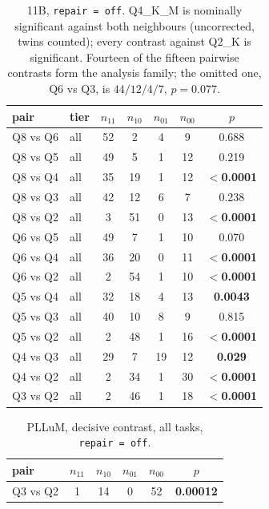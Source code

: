 \documentclass[11pt]{article}
\begin{document}
\begin{table}[h]
\centering\small
\caption{11B, \texttt{repair\,=\,off}. Q4\_K\_M is nominally significant against both neighbours (uncorrected, twins counted); every contrast against Q2\_K is significant. Fourteen of the fifteen pairwise contrasts form the analysis family; the omitted one, Q6 vs Q3, is $44/12/4/7$, $p=0.077$.}
\label{tab:mcnemar11b}
\begin{tabular}{llccccc}
\toprule
pair & tier & $n_{11}$ & $n_{10}$ & $n_{01}$ & $n_{00}$ & $p$ \\
\midrule
Q8 vs Q6 & all  & 52 & 2 & 4 & 9 & 0.688 \\
Q8 vs Q5 & all  & 49 & 5 & 1 & 12& 0.219 \\
Q8 vs Q4 & all  & 35 & 19& 1 & 12& \textbf{$<$0.0001} \\
Q8 vs Q3 & all  & 42 & 12& 6 & 7 & 0.238 \\
Q8 vs Q2 & all  & 3  & 51& 0 & 13& \textbf{$<$0.0001} \\
Q6 vs Q5 & all  & 49 & 7 & 1 & 10& 0.070 \\
Q6 vs Q4 & all  & 36 & 20& 0 & 11& \textbf{$<$0.0001} \\
Q6 vs Q2 & all  & 2  & 54& 1 & 10& \textbf{$<$0.0001} \\
Q5 vs Q4 & all  & 32 & 18& 4 & 13& \textbf{0.0043} \\
Q5 vs Q3 & all  & 40 & 10& 8 & 9 & 0.815 \\
Q5 vs Q2 & all  & 2  & 48& 1 & 16& \textbf{$<$0.0001} \\
Q4 vs Q3 & all  & 29 & 7 & 19& 12& \textbf{0.029} \\
Q4 vs Q2 & all  & 2  & 34& 1 & 30& \textbf{$<$0.0001} \\
Q3 vs Q2 & all  & 2  & 46& 1 & 18& \textbf{$<$0.0001} \\
\bottomrule
\end{tabular}
\end{table}

\begin{table}[h]
\centering\small
\caption{PLLuM, decisive contrast, all tasks, \texttt{repair\,=\,off}.}
\label{tab:mcnemarpllum}
\begin{tabular}{lccccc}
\toprule
pair & $n_{11}$ & $n_{10}$ & $n_{01}$ & $n_{00}$ & $p$ \\
\midrule
Q3 vs Q2 & 1 & 14 & 0 & 52 & \textbf{0.00012} \\
\bottomrule
\end{tabular}
\end{table}
\end{document}

